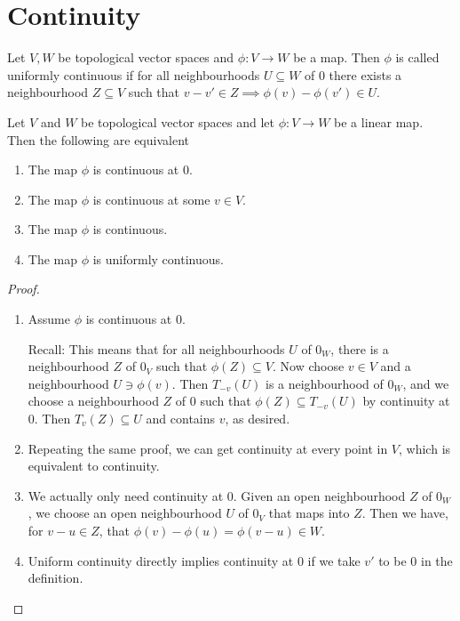 \documentclass[twoside,symmetric, openany, 12pt]{./tuftebook}
\theoremstyle{definition}
\theoremstyle{definition}
\theoremstyle{definition}
\newenvironment{parts}{\begin{enumerate}[label=(\alph*)]}{\end{enumerate}}
\begin{document}
	\section{Continuity}
	\begin{Definition}
		Let $V,W$ be topological vector spaces and $\phi:V\to W$ be a map. Then $\phi$ is called uniformly continuous if for all neighbourhoods $U\subseteq W$ of $0$ there exists a neighbourhood $Z\subseteq V$ such that $v-v'\in Z\implies \phi(v)-\phi(v')\in U$.
	\end{Definition}
	\begin{Theorem}
		Let $V$ and $W$ be topological vector spaces and let $\phi:V\to W$ be a linear map. Then the following are equivalent
		\begin{parts}
			\item The map $\phi$ is continuous at $0$.
			\item The map $\phi$ is continuous at some $v\in V$.
			\item The map $\phi$ is continuous.
			\item The map $\phi$ is uniformly continuous.
		\end{parts}
	\end{Theorem}
	\begin{proof}
		\begin{enumerate}
			\item Assume $\phi$ is continuous at 0. 
			
			Recall: This means that for all neighbourhoods $U$ of $0_W$, there is a neighbourhood $Z$ of $0_V$ such that $\phi(Z)\subseteq V$. Now choose $v\in V$ and a neighbourhood $U\ni \phi(v)$. Then $T_{-v}(U)$ is a neighbourhood of $0_W$, and we choose a neighbourhood $Z$ of $0$ such that $\phi(Z)\subseteq T_{-v}(U)$ by continuity at $0$. Then $T_v(Z)\subseteq U$ and contains $v$, as desired.
			\item Repeating the same proof, we can get continuity at every point in $V$, which is equivalent to continuity.
			\item We actually only need continuity at 0. Given an open neighbourhood $Z$ of $0_W$, we choose an open neighbourhood $U$ of $0_V$ that maps into $Z$. Then we have, for $v-u\in Z$, that $\phi(v)-\phi(u)=\phi(v-u)\in W$.
			\item Uniform continuity directly implies continuity at 0 if we take $v'$ to be $0$ in the definition. \qedhere
		\end{enumerate}
	\end{proof}
\end{document}
